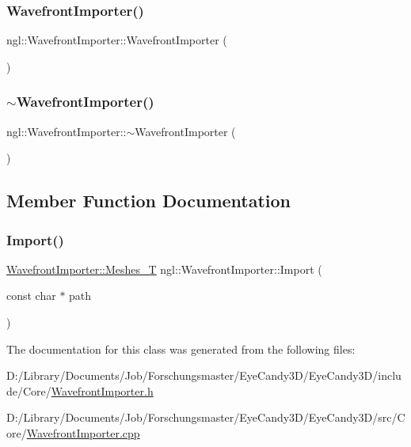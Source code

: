 \subsubsection{\texorpdfstring{Wavefront\+Importer()}{WavefrontImporter()}}
{\footnotesize\ttfamily ngl\+::\+Wavefront\+Importer\+::\+Wavefront\+Importer (\begin{DoxyParamCaption}{ }\end{DoxyParamCaption})\hspace{0.3cm}{\ttfamily [explicit]}}

\mbox{\label{classngl_1_1_wavefront_importer_aace3551746ca3775d726e9de7c9eb95e}} 
\subsubsection{\texorpdfstring{$\sim$\+Wavefront\+Importer()}{~WavefrontImporter()}}
{\footnotesize\ttfamily ngl\+::\+Wavefront\+Importer\+::$\sim$\+Wavefront\+Importer (\begin{DoxyParamCaption}{ }\end{DoxyParamCaption})}



\subsection{Member Function Documentation}
\mbox{\label{classngl_1_1_wavefront_importer_a4a5a54c6fadc2c60a15301790ccdd0ed}} 
\subsubsection{\texorpdfstring{Import()}{Import()}}
{\footnotesize\ttfamily \mbox{\hyperlink{classngl_1_1_wavefront_importer_aaddcb6ac6e44cc79d8fe986cf7645443}{Wavefront\+Importer\+::\+Meshes\+\_\+T}} ngl\+::\+Wavefront\+Importer\+::\+Import (\begin{DoxyParamCaption}\item[{const char $\ast$}]{path }\end{DoxyParamCaption})}



The documentation for this class was generated from the following files\+:\begin{DoxyCompactItemize}
\item 
D\+:/\+Library/\+Documents/\+Job/\+Forschungsmaster/\+Eye\+Candy3\+D/\+Eye\+Candy3\+D/include/\+Core/\mbox{\hyperlink{_wavefront_importer_8h}{Wavefront\+Importer.\+h}}\item 
D\+:/\+Library/\+Documents/\+Job/\+Forschungsmaster/\+Eye\+Candy3\+D/\+Eye\+Candy3\+D/src/\+Core/\mbox{\hyperlink{_wavefront_importer_8cpp}{Wavefront\+Importer.\+cpp}}\end{DoxyCompactItemize}
